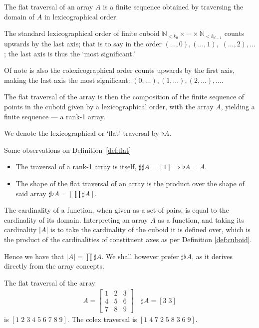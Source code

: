 \documentclass{DIKU-report-variant}
\newcommand\Nat{\mathbb{N}}
\newcommand\impl{\mathrel{\Rightarrow}}
\begin{document}
\begin{definition}
  \label{def:flat}
  The flat traversal of an array \(A\) is a finite sequence obtained by
  traversing the domain of \(A\) in lexicographical order.
  
  The standard lexicographical order of finite cuboid
  \(\Nat_{<k_0} \times \cdots \times \Nat_{<k_{d-1}}\) counts upwards by the
  last axis; that is to say in the order \((\dots,0), (\dots,1),\) \((\dots,2), \dots\);
  the last axis is thus the `most significant.'

  Of note is also the colexicographical order counts upwards by the first
  axis, making the last axis the most significant: \((0,\dots), (1,\dots), (2,\dots), \dots\).

  The flat traversal of the array is then the composition of the finite
  sequence of points in the cuboid given by a lexicographical order,
  with the array \(A\), yielding a finite sequence --- a rank-1 array.

  We denote the lexicographical or `flat' traversal by \(\flat A\).
\end{definition}
\begin{observation}
  \label{ob:flat}
  Some observations on Definition~\ref{def:flat}
  \begin{itemize}
    \item The traversal of a rank-1 array is itself, \(\sharp \sharp A = [1] \impl \flat A = A\).
    \item The shape of the flat traversal of an array is the product over the shape
       of said array \(\sharp \flat A = \left[\prod \sharp A\right]\).
  \end{itemize}
\end{observation}

\begin{observation}
  \label{ob:cardinality}
  The cardinality of a function, when given as a set of pairs, is equal to
  the cardinality of its domain. Interpreting an array \(A\) as a function, and
  taking its cardinality \(|A|\) is to take the cardinality of the cuboid it is
  defined over, which is the product of the cardinalities of constituent axes as
  per Definition \ref{def:cuboid}.

  Hence we have that \(|A| = \prod \sharp A\).
  We shall however prefer \(\sharp \flat A\), as it derives directly from
  the array concepts.
\end{observation}

\begin{example}
  \label{ex:flat}
  The flat traversal of the array
  \begin{align*}
    A =
    \begin{bmatrix}
      1 & 2 & 3 \\
      4 & 5 & 6 \\
      7 & 8 & 9
    \end{bmatrix} \quad \sharp A = [3\; 3]
  \end{align*}
  is \([1\; 2\; 3\; 4\; 5\; 6\; 7\; 8\; 9]\).
  The colex traversal is \([1\; 4\; 7\; 2\; 5\; 8\; 3\; 6\; 9]\).
\end{example}
\end{document}
